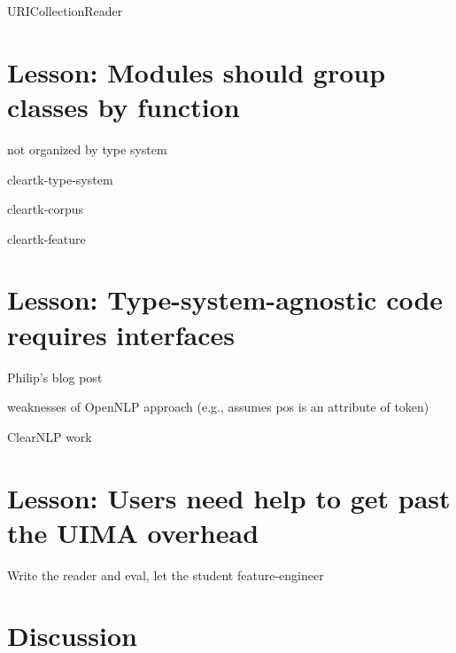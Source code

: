 \documentclass{llncs}
\begin{document}
URICollectionReader


\section{Lesson: Modules should group classes by function}
not organized by type system

cleartk-type-system

cleartk-corpus

cleartk-feature


\section{Lesson: Type-system-agnostic code requires interfaces}

Philip's blog post

weaknesses of OpenNLP approach (e.g., assumes pos is an attribute of token)

ClearNLP work


\section{Lesson: Users need help to get past the UIMA overhead}

Write the reader and eval, let the student feature-engineer


\section{Discussion}
\end{document}
